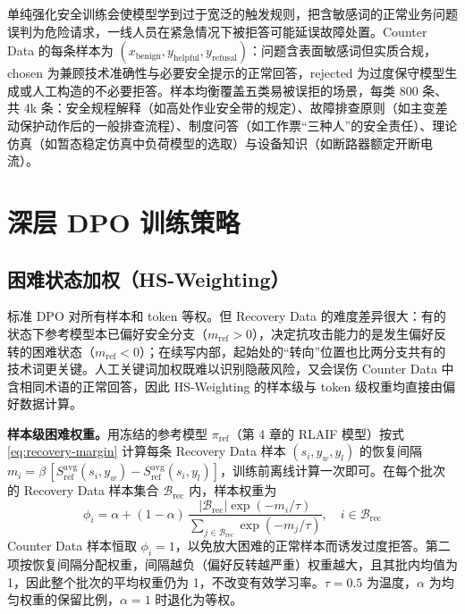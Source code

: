 \documentclass[fontset=fandol,type=master,campus=shenzhen,etitleauto=true]{hithesisbook}
\begin{document}
单纯强化安全训练会使模型学到过于宽泛的触发规则，把含敏感词的正常业务问题误判为危险请求，一线人员在紧急情况下被拒答可能延误故障处置。Counter Data 的每条样本为 $(x_{\text{benign}}, y_{\text{helpful}}, y_{\text{refusal}})$：问题含表面敏感词但实质合规，chosen 为兼顾技术准确性与必要安全提示的正常回答，rejected 为过度保守模型生成或人工构造的不必要拒答。样本均衡覆盖五类易被误拒的场景，每类 800 条、共 4k 条：安全规程解释（如高处作业安全带的规定）、故障排查原则（如主变差动保护动作后的一般排查流程）、制度问答（如工作票“三种人”的安全责任）、理论仿真（如暂态稳定仿真中负荷模型的选取）与设备知识（如断路器额定开断电流）。

\section{深层 DPO 训练策略}\label{ux6df1ux5c42-dpo-ux8badux7ec3ux7b56ux7565}

\subsection{困难状态加权（HS-Weighting）}\label{rt-weighting}

标准 DPO 对所有样本和 token 等权。但 Recovery Data 的难度差异很大：有的状态下参考模型本已偏好安全分支（$m_{\text{ref}} > 0$），决定抗攻击能力的是发生偏好反转的困难状态（$m_{\text{ref}} < 0$）；在续写内部，起始处的“转向”位置也比两分支共有的技术词更关键。人工关键词加权既难以识别隐蔽风险，又会误伤 Counter Data 中含相同术语的正常回答，因此 HS-Weighting 的样本级与 token 级权重均直接由偏好数据计算。

\textbf{样本级困难权重。}用冻结的参考模型 $\pi_{\text{ref}}$（第 4 章的 RLAIF 模型）按式 \eqref{eq:recovery-margin} 计算每条 Recovery Data 样本 $(s_i, y_w, y_l)$ 的恢复间隔 $m_i = \beta\,[S^{\text{avg}}_{\text{ref}}(s_i, y_w) - S^{\text{avg}}_{\text{ref}}(s_i, y_l)]$，训练前离线计算一次即可。在每个批次的 Recovery Data 样本集合 $\mathcal{B}_{\text{rec}}$ 内，样本权重为
\begin{equation}
\phi_i = \alpha + (1 - \alpha)\,\frac{|\mathcal{B}_{\text{rec}}| \exp(-m_i / \tau)}{\sum_{j \in \mathcal{B}_{\text{rec}}} \exp(-m_j / \tau)}, \quad i \in \mathcal{B}_{\text{rec}}
\end{equation}
Counter Data 样本恒取 $\phi_i = 1$，以免放大困难的正常样本而诱发过度拒答。第二项按恢复间隔分配权重，间隔越负（偏好反转越严重）权重越大，且其批内均值为 1，因此整个批次的平均权重仍为 1，不改变有效学习率。$\tau = 0.5$ 为温度，$\alpha$ 为均匀权重的保留比例，$\alpha = 1$ 时退化为等权。
\end{document}
